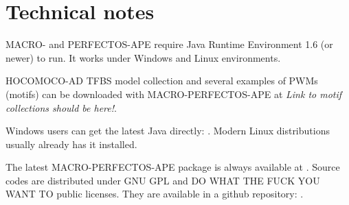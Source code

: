 \section{Technical notes}
MACRO- and PERFECTOS-APE require Java Runtime Environment 1.6 (or newer) to run. It works under Windows and Linux 
environments. 

HOCOMOCO-AD  TFBS model collection and several examples of PWMs (motifs) can be downloaded with MACRO-PERFECTOS-APE at \emph{Link to motif collections should be here!}.

Windows users can get the latest Java directly: . 
Modern Linux distributions usually already has it installed.

The latest MACRO-PERFECTOS-APE package is always available at . Source codes are distributed under GNU GPL and DO WHAT THE FUCK YOU WANT TO public licenses. They are available in a github repository: .
